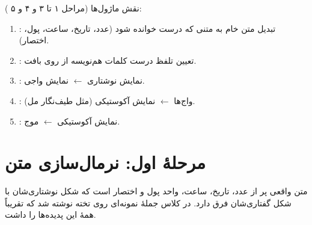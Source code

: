 نقش ماژول‌ها (مراحل ۱ تا ۳  و ۴ و ۵ ):
\begin{enumerate}
  \item {}: تبدیل متن خام به متنی که درست خوانده شود (عدد، تاریخ، ساعت، پول، اختصار).
  \item {}: تعیین تلفظ درست کلمات هم‌نویسه از روی بافت.
  \item {}: نمایش نوشتاری $\leftarrow$ نمایش واجی.
  \item {}: واج‌ها $\leftarrow$ نمایش آکوستیکی (مثل طیف‌نگار مل).
  \item {}: نمایش آکوستیکی $\leftarrow$ موج.
\end{enumerate}

\section{مرحلهٔ اول: نرمال‌سازی متن}

متن واقعی پر از عدد، تاریخ، ساعت، واحد پول و اختصار است که شکل نوشتاری‌شان با شکل گفتاری‌شان فرق دارد. در کلاس جملهٔ نمونه‌ای روی تخته نوشته شد که تقریباً همهٔ این پدیده‌ها را داشت.

